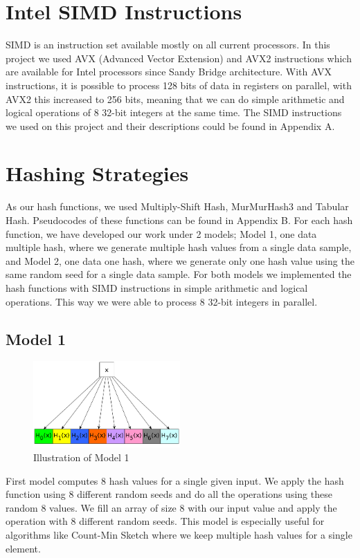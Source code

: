 \documentclass[11pt,oneside,a4paper]{article}
\begin{document}
\section{Intel SIMD Instructions}
SIMD is an instruction set available mostly on all current processors. In this project we used AVX (Advanced Vector Extension) and AVX2 instructions which are available for Intel processors since Sandy Bridge architecture. With AVX instructions, it is possible to process 128 bits of data in registers on parallel, with AVX2 this increased to 256 bits, meaning that we can do simple arithmetic and logical operations of 8 32-bit integers at the same time. The SIMD instructions we used on this project and their descriptions could be found in Appendix A.
\section{Hashing Strategies}
As our hash functions, we used Multiply-Shift Hash, MurMurHash3  and Tabular Hash. Pseudocodes of these functions can be found in Appendix B. For each hash function, we have developed our work under 2 models; Model 1, one data multiple hash, where we generate multiple hash values from a single data sample, and Model 2, one data one hash, where we generate only one hash value using the same random seed for a single data sample. For both models we implemented the hash functions with SIMD instructions in simple arithmetic and logical operations. This way we were able to process 8 32-bit integers in parallel.
\subsection{Model 1}
\begin{figure}[H]
\centering
\includegraphics[width=0.5\textwidth]{one_data_multi_hash.png} 
\caption{Illustration of Model 1}
\end{figure}
First model computes 8 hash values for a single given input. We apply the hash function using 8 different random seeds and do all the operations using these random 8 values. We fill an array of size 8 with our input value and apply the operation with 8 different random seeds. This model is especially useful for algorithms like Count-Min Sketch where we keep multiple hash values for a single element. 
\end{document}
